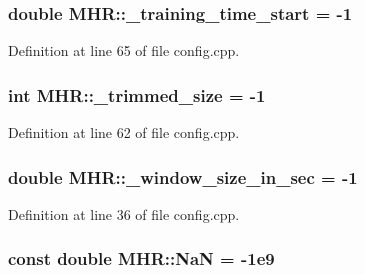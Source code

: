 \hypertarget{namespace_m_h_r_a32705f521f2a65e0b5c5454b328c26db}{
\subsubsection[{\+\_\+training\+\_\+time\+\_\+start}]{\setlength{\rightskip}{0pt plus 5cm}double M\+H\+R\+::\+\_\+training\+\_\+time\+\_\+start = -\/1}}\label{namespace_m_h_r_a32705f521f2a65e0b5c5454b328c26db}


Definition at line 65 of file config.\+cpp.

\hypertarget{namespace_m_h_r_a87eb7e22893e5160d4a98344bc8bdff4}{
\subsubsection[{\+\_\+trimmed\+\_\+size}]{\setlength{\rightskip}{0pt plus 5cm}int M\+H\+R\+::\+\_\+trimmed\+\_\+size = -\/1}}\label{namespace_m_h_r_a87eb7e22893e5160d4a98344bc8bdff4}


Definition at line 62 of file config.\+cpp.

\hypertarget{namespace_m_h_r_a9732a5bb1cbdb99030149ae2bb1cae69}{
\subsubsection[{\+\_\+window\+\_\+size\+\_\+in\+\_\+sec}]{\setlength{\rightskip}{0pt plus 5cm}double M\+H\+R\+::\+\_\+window\+\_\+size\+\_\+in\+\_\+sec = -\/1}}\label{namespace_m_h_r_a9732a5bb1cbdb99030149ae2bb1cae69}


Definition at line 36 of file config.\+cpp.

\hypertarget{namespace_m_h_r_a1f2bac57e6ccaebc6afd932278b163ec}{
\subsubsection[{Na\+N}]{\setlength{\rightskip}{0pt plus 5cm}const double M\+H\+R\+::\+Na\+N = -\/1e9}}\label{namespace_m_h_r_a1f2bac57e6ccaebc6afd932278b163ec}


